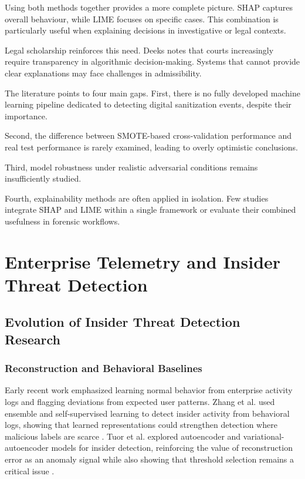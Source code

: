 Using both methods together provides a more complete picture. SHAP captures overall behaviour, while LIME focuses on specific cases. This combination is particularly useful when explaining decisions in investigative or legal contexts.

Legal scholarship reinforces this need. Deeks \cite{ref60} notes that courts increasingly require transparency in algorithmic decision-making. Systems that cannot provide clear explanations may face challenges in admissibility.

The literature points to four main gaps.
First, there is no fully developed machine learning pipeline dedicated to detecting digital sanitization events, despite their importance.

Second, the difference between SMOTE-based cross-validation performance and real test performance is rarely examined, leading to overly optimistic conclusions.

Third, model robustness under realistic adversarial conditions remains insufficiently studied.

Fourth, explainability methods are often applied in isolation. Few studies integrate SHAP and LIME within a single framework or evaluate their combined usefulness in forensic workflows.






\section{Enterprise Telemetry and Insider Threat Detection}

\subsection{Evolution of Insider Threat Detection Research}
\subsubsection{Reconstruction and Behavioral Baselines}
Early recent work emphasized learning normal behavior from enterprise activity logs and flagging deviations from expected user patterns. Zhang et al. used ensemble and self-supervised learning to detect insider activity from behavioral logs, showing that learned representations could strengthen detection where malicious labels are scarce \cite{zhang2021ensemble}. Tuor et al. explored autoencoder and variational-autoencoder models for insider detection, reinforcing the value of reconstruction error as an anomaly signal while also showing that threshold selection remains a critical issue \cite{tuor2021autoencoder}.

